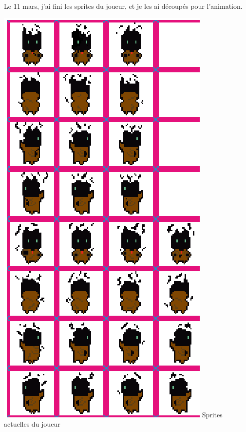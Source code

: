 \documentclass[]{extarticle}
\begin{document}
\begin{spacing}{1.25}
Le 11 mars, j'ai fini les sprites du joueur, et je les ai découpés pour l'animation.
 \bigbreak
\begin{center}
\includegraphics[scale = 0.25]{spritePerso.png}
\bigbreak
Sprites actuelles du joueur
\end{center}
\bigbreak

\end{spacing}
\end{document}
